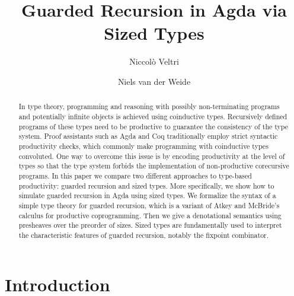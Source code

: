 \documentclass[a4paper,UKenglish,cleveref, autoref,numberwithinsect]{lipics-v2019}
\title{Guarded Recursion in Agda via Sized Types}
\author{Niccol\`o Veltri}{Department of Computer Science, IT
  University of Copenhagen, Denmark}{nive@itu.dk}{https://orcid.org/0000-0002-7230-3436}{This work was supported by a research grant (13156) from VILLUM FONDEN,
  and by DFF-Research Project 1 Grant no. 4002-00442, from The Danish Council 
  for Independent Research for the Natural Sciences (FNU).}
\author{Niels van der Weide}{Institute for Computation and Information Sciences, Radboud University, Nijmegen, The Netherlands}{nweide@cs.ru.nl}{https://orcid.org/0000-0003-1146-4161}{}
\begin{document}
\maketitle

\begin{abstract}
  In type theory, programming and reasoning with possibly
  non-terminating programs and potentially infinite objects is
  achieved using coinductive types. Recursively defined programs of
  these types need to be productive to guarantee the
  consistency of the type system. Proof assistants such as Agda and
  Coq traditionally employ strict syntactic productivity checks, which
  commonly make programming with coinductive types convoluted.  One
  way to overcome this issue is by encoding productivity at the level
  of types so that the type system forbids the implementation of
  non-productive corecursive programs.
  In this paper we compare two different approaches to type-based
  productivity: guarded recursion and sized types. More specifically,
  we show how to simulate guarded recursion in Agda using sized
  types. We formalize the syntax of a simple type theory for guarded
  recursion, which is a variant of Atkey and McBride's
  calculus for productive coprogramming. Then we give a denotational semantics
  using presheaves over the preorder of sizes. Sized types are
  fundamentally used to interpret the characteristic
  features of guarded recursion, notably the fixpoint combinator.
\end{abstract}

\section{Introduction}
\label{sec:intro}

\end{document}
